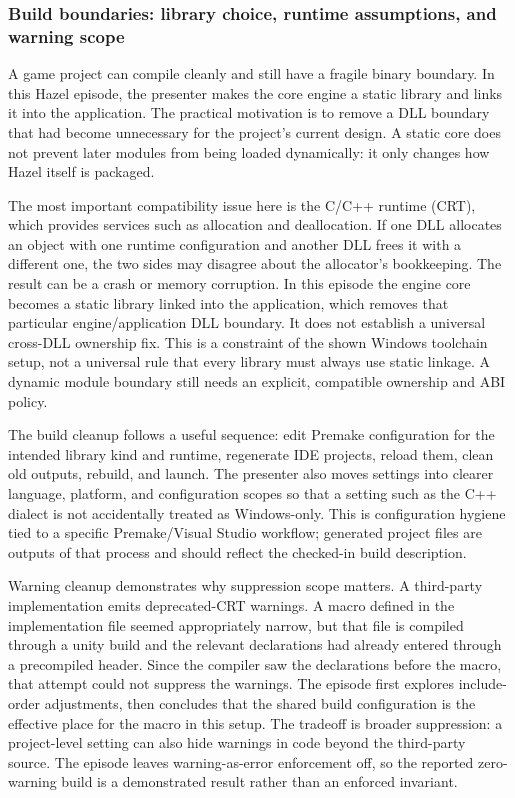 \subsubsection{Build boundaries: library choice, runtime assumptions, and warning scope}\label{build-boundaries-library-choice-runtime-assumptions-and-warning-scope}

A game project can compile cleanly and still have a fragile binary boundary. In this Hazel episode, the presenter makes the core engine a static library and links it into the application. The practical motivation is to remove a DLL boundary that had become unnecessary for the project's current design. A static core does not prevent later modules from being loaded dynamically: it only changes how Hazel itself is packaged.

The most important compatibility issue here is the C/C++ runtime (CRT), which provides services such as allocation and deallocation. If one DLL allocates an object with one runtime configuration and another DLL frees it with a different one, the two sides may disagree about the allocator's bookkeeping. The result can be a crash or memory corruption. In this episode the engine core becomes a static library linked into the application, which removes that particular engine/application DLL boundary. It does not establish a universal cross-DLL ownership fix. This is a constraint of the shown Windows toolchain setup, not a universal rule that every library must always use static linkage. A dynamic module boundary still needs an explicit, compatible ownership and ABI policy.

The build cleanup follows a useful sequence: edit Premake configuration for the intended library kind and runtime, regenerate IDE projects, reload them, clean old outputs, rebuild, and launch. The presenter also moves settings into clearer language, platform, and configuration scopes so that a setting such as the C++ dialect is not accidentally treated as Windows-only. This is configuration hygiene tied to a specific Premake/Visual Studio workflow; generated project files are outputs of that process and should reflect the checked-in build description.

Warning cleanup demonstrates why suppression scope matters. A third-party implementation emits deprecated-CRT warnings. A macro defined in the implementation file seemed appropriately narrow, but that file is compiled through a unity build and the relevant declarations had already entered through a precompiled header. Since the compiler saw the declarations before the macro, that attempt could not suppress the warnings. The episode first explores include-order adjustments, then concludes that the shared build configuration is the effective place for the macro in this setup. The tradeoff is broader suppression: a project-level setting can also hide warnings in code beyond the third-party source. The episode leaves warning-as-error enforcement off, so the reported zero-warning build is a demonstrated result rather than an enforced invariant.

